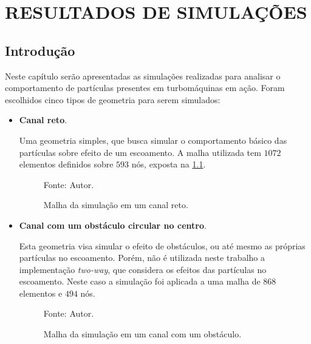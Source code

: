 \chapter{RESULTADOS DE SIMULAÇÕES}
\label{resultados}
\section{\textbf{Introdução}}
Neste capítulo serão apresentadas as simulações realizadas para analisar o comportamento de partículas presentes em turbomáquinas em ação.
Foram escolhidos cinco tipos de geometria para serem simulados:
\begin{itemize}
    \item \textbf{Canal reto}.

        Uma geometria simples, que busca simular o comportamento básico das partículas sobre efeito de um escoamento. 
        A malha utilizada tem $1072$ elementos definidos sobre $593$ nós, exposta na \ref{channel_mesh}.
        \begin{figure}[H]
            \centering
             {\raggedleft \scriptsize Fonte: Autor.}
            \caption{Malha da simulação em um canal reto.}
            \label{channel_mesh}
        \end{figure}

    \item \textbf{Canal com um obstáculo circular no centro}.

        Esta geometria visa simular o efeito de obstáculos, ou até mesmo as próprias partículas no escoamento.
        Porém, não é utilizada neste trabalho a implementação \textit{two-way}, que considera os efeitos das partículas no escoamento.
        Neste caso a simulação foi aplicada a uma malha de $868$ elementos e $494$ nós.
        \begin{figure}[H]
            \centering
             {\raggedleft \scriptsize Fonte: Autor.}
            \caption{Malha da simulação em um canal com um obstáculo.}
            \label{obstacle_mesh}
        \end{figure}


\end{itemize}
